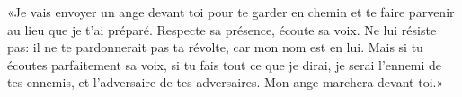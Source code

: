 «Je vais envoyer un ange devant toi pour te garder en chemin
	et te faire parvenir au lieu que je t’ai préparé.
Respecte sa présence, écoute sa voix. Ne lui résiste pas:
	il ne te pardonnerait pas ta révolte, car mon nom est en lui.
Mais si tu écoutes parfaitement sa voix, si tu fais tout ce que je dirai,
	je serai l’ennemi de tes ennemis, et l’adversaire de tes adversaires.
Mon ange marchera devant toi.»
